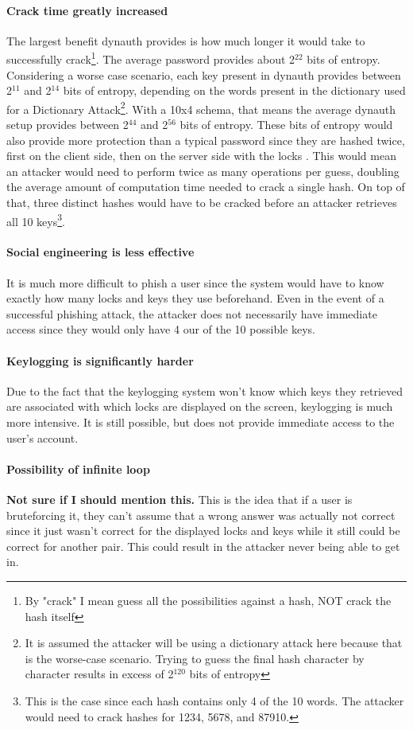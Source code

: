 \documentclass[conference]{IEEEtran}
\begin{document}
	\paragraph{Crack time greatly increased} The largest benefit dynauth provides is how much longer it would take to successfully crack\footnote{By "crack" I mean guess all the possibilities against a hash, NOT crack the hash itself}. The average password provides about 2$^{22}$ bits of entropy\cite{Citation Needed}. Considering a worse case scenario, each key present in dynauth provides between 2$^{11}$ and 2$^{14}$ bits of entropy, depending on the words present in the dictionary used for a Dictionary Attack\footnote{It is assumed the attacker will be using a dictionary attack here because that is the worse-case scenario. Trying to guess the final hash character by character results in excess of 2$^{120}$ bits of entropy}. With a 10x4 schema, that means the average dynauth setup provides between 2$^{44}$ and 2$^{56}$ bits of entropy. These bits of entropy would also provide more protection than a typical password since they are hashed twice, first on the client side, then on the server side with the locks . This would mean an attacker would need to perform twice as many operations per guess, doubling the average amount of computation time needed to crack a single hash. On top of that, three distinct hashes would have to be cracked before an attacker retrieves all 10 keys\footnote{This is the case since each hash contains only 4 of the 10 words. The attacker would need to crack hashes for 1234, 5678, and 87910.}.
	\paragraph{Social engineering is less effective} It is much more difficult to phish a user since the system would have to know exactly how many locks and keys they use beforehand. Even in the event of a successful phishing attack, the attacker does not necessarily have immediate access since they would only have 4 our of the 10 possible keys.
	\paragraph{Keylogging is significantly harder} Due to the fact that the keylogging system won't know which keys they retrieved are associated with which locks are displayed on the screen, keylogging is much more intensive. It is still possible, but does not provide immediate access to the user's account.
	\paragraph{Possibility of infinite loop} \textbf{Not sure if I should mention this.} This is the idea that if a user is bruteforcing it, they can't assume that a wrong answer was actually not correct since it just wasn't correct for the displayed locks and keys while it still could be correct for another pair. This could result in the attacker never being able to get in.
\end{document}

